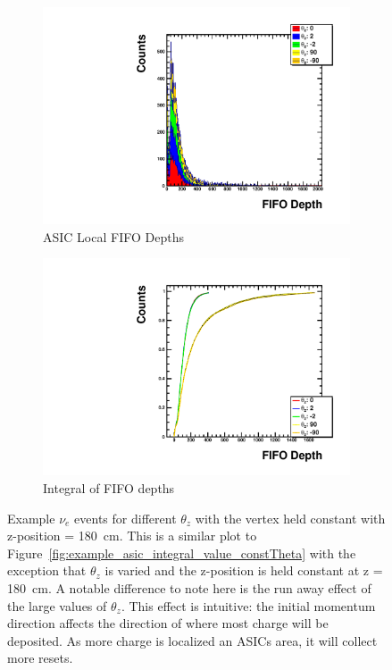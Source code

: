 \begin{figure}
\centering
\begin{subfigure}{.5\textwidth}
  \centering
  \includegraphics[width=\textwidth]{images/Const_Z180_ASIC_stack_integral_pdg12_fhc.pdf}
  \caption{ASIC Local FIFO Depths}
\end{subfigure}%
\begin{subfigure}{.5\textwidth}
  \centering
  \includegraphics[width=\textwidth]{images/Const_Z180_ASIC_integral_pdg12_fhc.pdf}
  \caption{Integral of FIFO depths}
\end{subfigure}
\caption{Example $\nu_{e}$ events for different $\theta_{z}$ with the vertex held constant with z-position = 180~\unit{cm}.
This is a similar plot to Figure~\ref{fig:example_asic_integral_value_constTheta} with the exception that $\theta_{z}$ is varied and the z-position is held constant at z = 180~\unit{cm}.
A notable difference to note here is the run away effect of the large values of $\theta_{z}$.
This effect is intuitive: the initial momentum direction affects the direction of where most charge will be deposited.
As more charge is localized an ASICs area, it will collect more resets. 
}
\label{fig:example_asic_integral_value_constZpos}
\end{figure}

